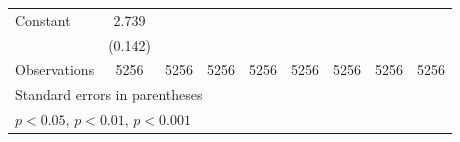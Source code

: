 \begin{table}[htbp]
\begin{tabular}{l*{8}{c}}
\addlinespace
Constant        &    2.739\sym{***}&                  &                  &                  &                  &                  &                  &                  \\
                &  (0.142)         &                  &                  &                  &                  &                  &                  &                  \\
\midrule
Observations    &     5256         &     5256         &     5256         &     5256         &     5256         &     5256         &     5256         &     5256         \\
\bottomrule
\multicolumn{9}{l}{\footnotesize Standard errors in parentheses}\\
\multicolumn{9}{l}{\footnotesize \sym{*} \(p<0.05\), \sym{**} \(p<0.01\), \sym{***} \(p<0.001\)}\\
\end{tabular}
\end{table}
